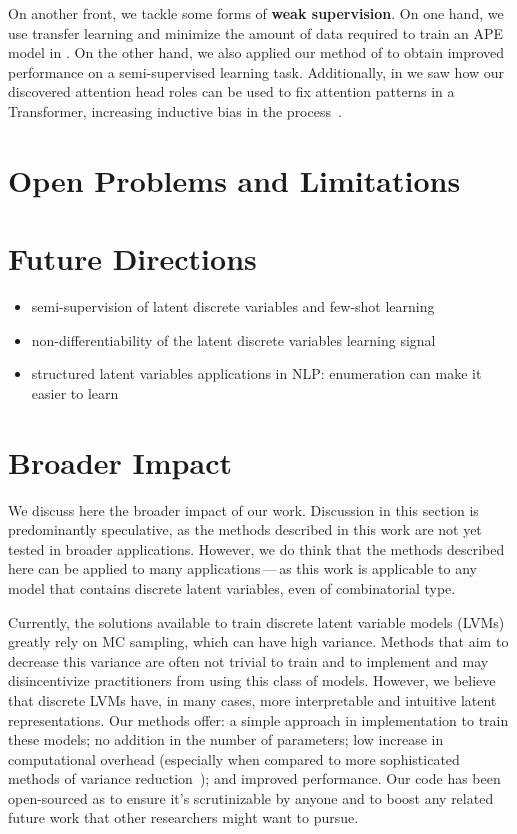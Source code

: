 On another front, we tackle some forms of \textbf{weak supervision}.
On one hand, we use transfer learning and minimize the amount of data
required to train an APE model in . On the other
hand, we also applied our method of  to
obtain improved performance on a semi-supervised learning task.
Additionally, in  we saw how our
discovered attention head roles can be used to fix attention patterns
in a Transformer, increasing inductive bias in the
process~\citep{raganato2020FixedEncoderSelfAttentiona}.

\section{Open Problems and Limitations}

\section{Future Directions}

\begin{itemize}
    \item semi-supervision of latent discrete variables and few-shot learning
    \item non-differentiability of the latent discrete variables learning signal
    \item structured latent variables applications in NLP: enumeration can make it easier to learn
\end{itemize}

\section{Broader Impact}

We discuss here the broader impact of our work. Discussion in this
section is predominantly speculative, as the methods described in
this work are not yet tested in broader applications. However, we do
think that the methods described here can be applied to many
applications\,---\,as this work is applicable to any model that
contains discrete latent variables, even of combinatorial type.

Currently, the solutions available to train discrete latent variable
models (LVMs) greatly rely on MC sampling, which can have high variance.
Methods that aim to decrease this variance are often not trivial to
train and to implement and may disincentivize practitioners from
using this class of models. However, we believe that discrete LVMs
have, in many cases, more interpretable and intuitive
latent representations. Our methods offer: a simple approach in
implementation to train these models; no addition in the number of
parameters; low increase in computational overhead (especially when
compared to more sophisticated methods of variance
reduction~\citep{RB19}); and improved performance. Our code has been
open-sourced as to ensure it's scrutinizable by
anyone and to boost any related future work that other researchers
might want to pursue.

